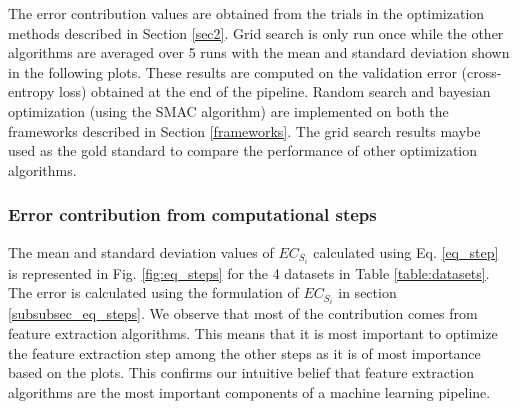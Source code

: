 The error contribution values are obtained from the trials in the optimization methods described in Section \ref{sec2}. Grid search is only run once while the other algorithms are averaged over 5 runs with the mean and standard deviation shown in the following plots. These results are computed on the validation error (cross-entropy loss) obtained at the end of the pipeline. Random search and bayesian optimization (using the SMAC algorithm) are implemented on both the frameworks described in Section \ref{frameworks}. The grid search results maybe used as the gold standard to compare the performance of other optimization algorithms. 

\subsubsection{Error contribution from computational steps}
The mean and standard deviation values of $EC_{S_i}$ calculated using Eq. \ref{eq_step} is represented in Fig. \ref{fig:eq_steps} for the 4 datasets in Table \ref{table:datasets}. The error is calculated using the formulation of $EC_{S_i}$ in section \ref{subsubsec_eq_steps}. We observe that most of the contribution comes from feature extraction algorithms. This means that it is most important to optimize the feature extraction step among the other steps as it is of most importance based on the plots. This confirms our intuitive belief that feature extraction algorithms are the most important components of a machine learning pipeline. 
